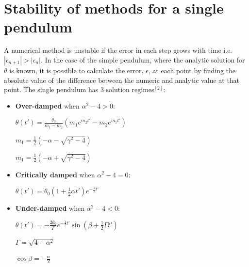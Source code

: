\documentclass[10pt,a4paper]{article}
\begin{document}
\section{Stability of methods for a single pendulum}
A numerical method is unstable if the error in each step grows with time i.e. $\left|\epsilon_{n+1}\right| > \left|\epsilon_{n}\right|$. In the case of the simple pendulum, where the analytic solution for $\theta$ is known, it is possible to calculate the error, $\epsilon$, at each point by finding the absolute value of the difference between the numeric and analytic value at that point. The single pendulum has 3 solution regimes$^{[2]}$:
\begin{itemize}
\item \textbf{Over-damped} when $\alpha^2 - 4 >0$:

\begin{math} \theta(t') = \frac{\theta_{0}}{m_{1}-m_{2}}(m_{1} e^{m_{2}t'}-m_{2} e^{m_{1}t'}) \end{math}

\begin{math} m_{1}=\frac{1}{2}\left(-\alpha - \sqrt{\gamma^2 - 4}\right) \end{math}

\begin{math} m_{1}=\frac{1}{2}\left(-\alpha + \sqrt{\gamma^2 - 4}\right) \end{math}

\item \textbf{Critically damped} when $\alpha^2 - 4 =0$:

\begin{math} \theta(t') = \theta_{0}\left(1+\frac{1}{2}\alpha t'\right)e^{-\frac{1}{2}t'}\end{math}

\item \textbf{Under-damped} when $\alpha^2 - 4 <0$:

\begin{math} \theta(t') = -\frac{2\theta_{0}}{\Gamma}e^{-\frac{1}{2}t'}\sin{\left(\beta + \frac{1}{2}\Gamma t'\right)}\end{math}

\begin{math} \Gamma = \sqrt{4-\alpha^2} \end{math}

\begin{math} \cos{\beta} =  - \frac{\alpha}{2}\end{math}


\end{itemize}
\end{document}
